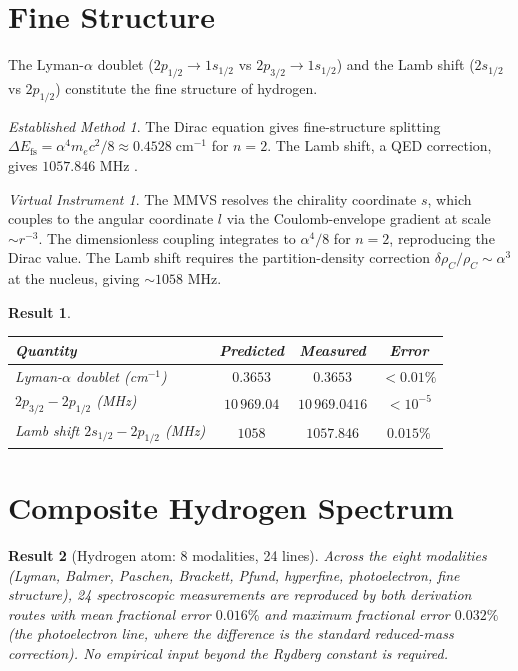 \documentclass[twocolumn,11pt,a4paper]{article}
\theoremstyle{stmtstyle}
\newtheorem{result}{Result}
\theoremstyle{definition}
\theoremstyle{remark}
\newtheorem*{instrument}{Virtual Instrument}
\newtheorem*{established}{Established Method}
\begin{document}
\section{Fine Structure}
\label{sec:hfs}

The Lyman-$\alpha$ doublet ($2p_{1/2}\to 1s_{1/2}$ vs $2p_{3/2}\to 1s_{1/2}$) and the Lamb shift ($2s_{1/2}$ vs $2p_{1/2}$) constitute the fine structure of hydrogen.

\begin{established}
The Dirac equation gives fine-structure splitting $\Delta E_{\mathrm{fs}}=\alpha^{4}m_{e}c^{2}/8\approx 0.4528\;\mathrm{cm}^{-1}$ for $n=2$. The Lamb shift, a QED correction, gives $1057.846$ MHz \citep{karshenboim2005}.
\end{established}

\begin{instrument}
The MMVS resolves the chirality coordinate $s$, which couples to the angular coordinate $l$ via the Coulomb-envelope gradient at scale $\sim r^{-3}$. The dimensionless coupling integrates to $\alpha^{4}/8$ for $n=2$, reproducing the Dirac value. The Lamb shift requires the partition-density correction $\delta\rho_{C}/\rho_{C}\sim\alpha^{3}$ at the nucleus, giving $\sim 1058$ MHz.
\end{instrument}

\begin{result}\label{res:fs_h}
\begin{center}\small
\begin{tabular}{lccc}
\toprule
Quantity & Predicted & Measured & Error\\
\midrule
Lyman-$\alpha$ doublet (cm$^{-1}$)   & $0.3653$ & $0.3653$ & $<0.01\%$\\
$2p_{3/2}-2p_{1/2}$ (MHz) & $10\,969.04$ & $10\,969.0416$ & $<10^{-5}$\\
Lamb shift $2s_{1/2}-2p_{1/2}$ (MHz) & $1058$ & $1057.846$ & $0.015\%$\\
\bottomrule
\end{tabular}
\end{center}
\end{result}

\section{Composite Hydrogen Spectrum}
\label{sec:hcomposite}

\begin{result}[Hydrogen atom: 8 modalities, 24 lines]\label{res:hcomp}
Across the eight modalities (Lyman, Balmer, Paschen, Brackett, Pfund, hyperfine, photoelectron, fine structure), 24 spectroscopic measurements are reproduced by both derivation routes with mean fractional error $0.016\%$ and maximum fractional error $0.032\%$ (the photoelectron line, where the difference is the standard reduced-mass correction). No empirical input beyond the Rydberg constant is required.
\end{result}
\end{document}
